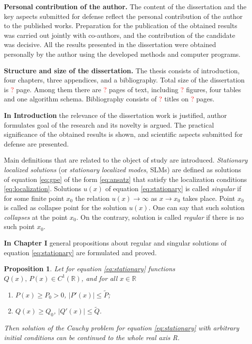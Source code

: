 \documentclass[candidate, href, colorlinks]{disser}
\newtheorem{proposition}{Proposition}
\begin{document}
\textbf{Personal contribution of the author.}
The content of the dissertation and the key aspects submitted for defense reflect the personal contribution of the author to the published works.
Preparation for the publication of the obtained results was carried out jointly with co-authors, and the contribution of the candidate was decisive.
All the results presented in the dissertation were obtained personally by the author using the developed methods and computer programs.

\textbf{Structure and size of the dissertation.}
The thesis consists of introduction, four chapters, three appendices, and a bibliography.
Total size of the dissertation is \textcolor{red}{?} page.
Among them there are \textcolor{red}{?} pages of text, including \textcolor{red}{?} figures, four tables and one algorithm schema.
Bibliography consists of \textcolor{red}{?} titles on \textcolor{red}{?} pages.


\textbf{In Introduction} the relevance of the dissertation work is justified, author formulates goal of the research and its novelty is argued.
The practical significance of the obtained results is shown, and scientific aspects submitted for defense are presented.

Main definitions that are related to the object of study are introduced.
{\it Stationary localized solutions} (or {\it stationary localized modes}, SLMs) are defined as solutions of equation \eqref{eq:gpe} of the form \eqref{eq:ansatz} that satisfy the localization conditions \eqref{eq:localization}.
Solutions $u(x)$ of equation \eqref{eq:stationary} is called  {\it singular} if for some finite point $x_0$ the relation $u(x) \to \infty$ as $x \to x_0$ takes place.
Point $x_0$ is called as collapse point for the solution $u(x)$.
One can say that such solution {\it collapses} at the point $x_0$.
On the contrary, solution is called {\it regular} if there is no such point $x_0$.

\textbf{In Chapter I} general propositions about regular and singular solutions of equation \eqref{eq:stationary} are formulated and proved.

\begin{proposition}
\label{prop:absense-of-singular-solutions}
	Let for equation \eqref{eq:stationary} functions $Q(x), \, P(x) \in C^1(\mathbb{R})$, and for all $x \in \mathbb{R}$
	\begin{enumerate}
		\item[(a)] $P(x) \ge P_0 > 0$, $|P'(x)| \le \widetilde{P}$;
		\item[(b)] $Q(x) \ge Q_0$, $|Q'(x)| \le \widetilde{Q}$.
	\end{enumerate}
	Then solution of the Cauchy problem for equation \eqref{eq:stationary} with arbitrary initial condi­tions can be continued to the whole real axis R.
\end{proposition}
\end{document}
